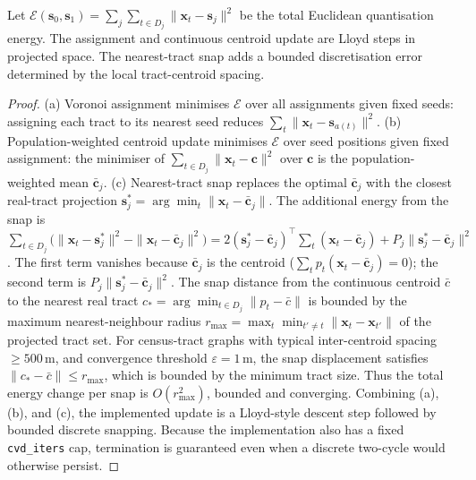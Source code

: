 \begin{proposition}
\label{prop:geo-convergence}
Let $\mathcal{E}(\mathbf{s}_0, \mathbf{s}_1)
= \sum_{j} \sum_{t \in D_j} \|\mathbf{x}_t - \mathbf{s}_j\|^2$
be the total Euclidean quantisation energy.
The assignment and continuous centroid update are Lloyd steps in projected
space. The nearest-tract snap adds a bounded discretisation error determined
by the local tract-centroid spacing.
\end{proposition}

\begin{proof}
(a) Voronoi assignment minimises $\mathcal{E}$ over all assignments given
    fixed seeds: assigning each tract to its nearest seed reduces
    $\sum_t \|\mathbf{x}_t - \mathbf{s}_{a(t)}\|^2$.
(b) Population-weighted centroid update minimises $\mathcal{E}$ over
    seed positions given fixed assignment: the minimiser of
    $\sum_{t \in D_j}\|\mathbf{x}_t - \mathbf{c}\|^2$ over $\mathbf{c}$ is the
    population-weighted mean $\bar{\mathbf{c}}_j$.
(c) Nearest-tract snap replaces the optimal $\bar{\mathbf{c}}_j$ with the closest
    real-tract projection $\mathbf{s}_j^* = \arg\min_{t}\|\mathbf{x}_t - \bar{\mathbf{c}}_j\|$.
    The additional energy from the snap is
    $\sum_{t \in D_j}\bigl(\|\mathbf{x}_t - \mathbf{s}_j^*\|^2 - \|\mathbf{x}_t - \bar{\mathbf{c}}_j\|^2\bigr)
    = 2(\mathbf{s}_j^* - \bar{\mathbf{c}}_j)^\top \sum_{t}(\mathbf{x}_t - \bar{\mathbf{c}}_j)
    + P_j\|\mathbf{s}_j^* - \bar{\mathbf{c}}_j\|^2$.
    The first term vanishes because $\bar{\mathbf{c}}_j$ is the centroid
    ($\sum_t p_t(\mathbf{x}_t - \bar{\mathbf{c}}_j) = 0$); the second term
    is $P_j\|\mathbf{s}_j^* - \bar{\mathbf{c}}_j\|^2$.
    The snap distance from the continuous centroid $\bar{c}$ to the nearest
    real tract $c_* = \arg\min_{t \in D_j} \|p_t - \bar{c}\|$ is bounded by
    the maximum nearest-neighbour radius
    $r_{\max} = \max_t \min_{t' \neq t} \|\mathbf{x}_t - \mathbf{x}_{t'}\|$
    of the projected tract set.
    For census-tract graphs with typical inter-centroid spacing $\geq 500\,$m,
    and convergence threshold $\varepsilon = 1\,$m, the snap displacement
    satisfies $\|c_* - \bar{c}\| \leq r_{\max}$, which is bounded by the
    minimum tract size.
    Thus the total energy change per snap is $O(r_{\max}^2)$, bounded and
    converging.
Combining (a), (b), and (c), the implemented update is a Lloyd-style descent
step followed by bounded discrete snapping. Because the implementation also
has a fixed \texttt{cvd\_iters} cap, termination is guaranteed even when a
discrete two-cycle would otherwise persist.
\end{proof}

